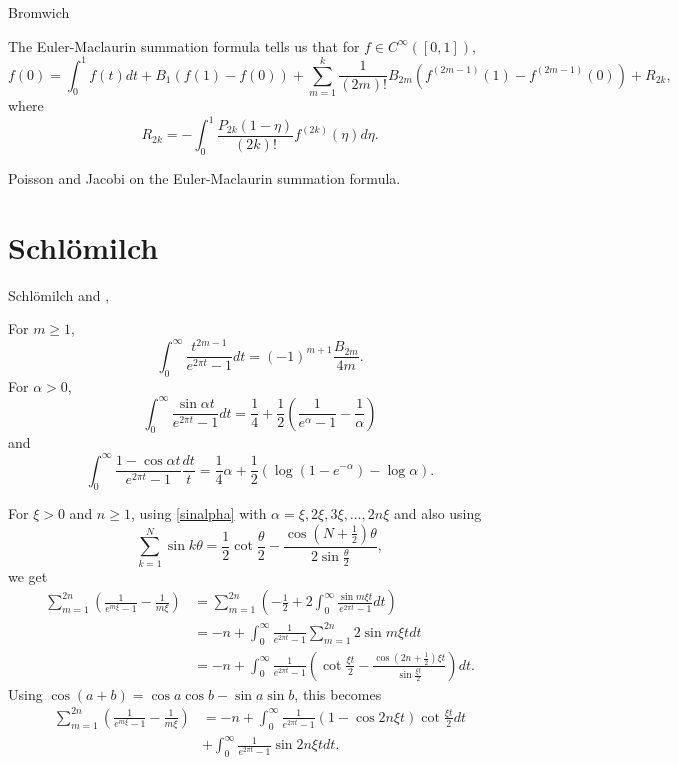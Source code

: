 \documentclass{amsart}
\begin{document}
Bromwich \cite[Chapter~XII]{bromwich}

The Euler-Maclaurin summation formula \cite[p.~280, Ch.~VI, Eq.~35]{bourbaki} tells us that for $f \in C^\infty([0,1])$,
\[
f(0)=\int_0^1 f(t) dt
+B_1(f(1)-f(0))+
\sum_{m=1}^k \frac{1}{(2m)!} B_{2m} ( f^{(2m-1)}(1)-f^{(2m-1)}(0))+R_{2k},
\]
where 
\[
R_{2k} = -\int_0^1 \frac{P_{2k}(1-\eta)}{(2k)!} f^{(2k)}(\eta) d\eta.
\]

Poisson and Jacobi  on the Euler-Maclaurin summation formula.



\section{Schl\"omilch}
Schl\"omilch \cite{schlomilch1861}  and  \cite[p.~238]{compendium}, \cite{schlomilch1863}


For $m \geq 1$,
\begin{equation}
\int_0^\infty \frac{t^{2m-1}}{e^{2\pi t}-1} dt=(-1)^{m+1} \frac{B_{2m}}{4m}.
\label{bernoulliInt}
\end{equation}
For $\alpha>0$,
\begin{equation}
\int_0^\infty \frac{\sin \alpha t}{e^{2\pi t}-1} dt = \frac{1}{4}+\frac{1}{2}\left(\frac{1}{e^\alpha-1}-\frac{1}{\alpha}\right)
\label{sinalpha}
\end{equation}
and
\begin{equation}
\int_0^\infty \frac{1-\cos \alpha t}{e^{2\pi t}-1} \frac{dt}{t} = \frac{1}{4}\alpha+\frac{1}{2}\left(\log(1-e^{-\alpha})-\log \alpha\right).
\label{cosalpha}
\end{equation}

For $\xi>0$ and $n \geq 1$, using \eqref{sinalpha} with $\alpha=\xi,2\xi,3\xi,\ldots,2n\xi$ 
and also using
\[
\sum_{k=1}^N \sin k\theta = \frac{1}{2}\cot \frac{\theta}{2}-\frac{\cos(N+\frac{1}{2})\theta}{2\sin \frac{\theta}{2}},
\]
we get
\begin{align*}
\sum_{m=1}^{2n} \left(\frac{1}{e^{m\xi}-1} -\frac{1}{m\xi} \right)&=\sum_{m=1}^{2n} \left(-\frac{1}{2}+2\int_0^\infty \frac{\sin m\xi t}{e^{2\pi t}-1} dt \right)\\
&=-n + \int_0^\infty \frac{1}{e^{2\pi t}-1} \sum_{m=1}^{2n} 2\sin m\xi t dt\\
&=-n+\int_0^\infty \frac{1}{e^{2\pi t}-1} \left(\cot \frac{\xi t}{2}-\frac{\cos(2n+\frac{1}{2})\xi t}{\sin \frac{\xi t}{2}} \right) dt.
\end{align*}
Using $\cos(a+b)=\cos a \cos b - \sin a \sin b$, this becomes
\begin{align}
\sum_{m=1}^{2n} \left(\frac{1}{e^{m\xi}-1} -\frac{1}{m\xi} \right)&=
-n+\int_0^\infty \frac{1}{e^{2\pi t}-1} (1-\cos 2n\xi t)\cot \frac{\xi t}{2}dt \label{xisum}\\
& +\int_0^\infty \frac{1}{e^{2\pi t}-1}  \sin 2n\xi t dt.
\nonumber
\end{align}
\end{document}
